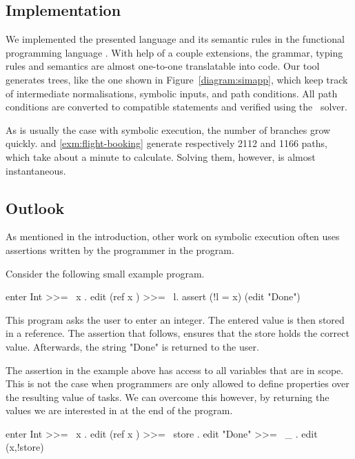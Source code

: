 \subsection{Implementation}

We implemented the presented language and its semantic rules in the functional programming language \HASKELL.
With help of a couple \GHC extensions, the grammar, typing rules and semantics are almost one-to-one translatable into code.
Our tool generates trees, like the one shown in Figure~\ref{diagram:simapp},
which keep track of intermediate normalisations, symbolic inputs, and path conditions.
All path conditions are converted to \SMTLIB compatible statements and verified using the \ZTHREE \SMT~solver.

As is usually the case with symbolic execution, the number of branches grow quickly.
 and \cref{exm:flight-booking} generate respectively 2112 and 1166 paths,
which take about a minute to calculate.
Solving them, however, is almost instantaneous.



\subsection{Outlook}
\label{subsec:outlook}

As mentioned in the introduction, other work on symbolic execution often uses assertions written by the programmer in the program.

\begin{example}
  Consider the following small example program.
  \begin{TASK}
    enter Int >>= \ x . edit (ref x ) >>= \ l. assert (!l = x) (edit "Done")
  \end{TASK}

  This program asks the user to enter an integer.
  The entered value is then stored in a reference.
  The assertion that follows, ensures that the store holds the correct value.
  Afterwards, the string "Done" is returned to the user.
\end{example}

The assertion in the example above has access to all variables that are in scope.
This is not the case when programmers are only allowed to define properties over the resulting value of tasks.
We can overcome this however, by returning the values we are interested in at the end of the program.

\begin{TASK}
  enter Int >>= \ x . edit (ref x ) >>= \ store . edit "Done" >>= \ _ . edit (x,!store)
\end{TASK}

